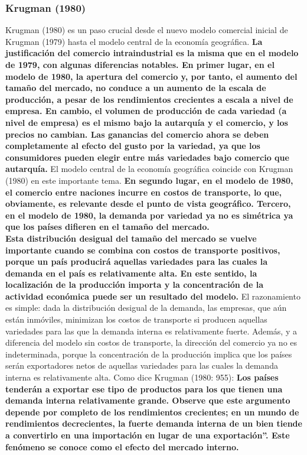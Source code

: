 \subsubsection{Krugman (1980)}
Krugman (1980) es un paso crucial desde el nuevo modelo comercial inicial de Krugman (1979) hasta el modelo central de la economía geográfica. \textbf{La justificación del comercio intraindustrial es la misma que en el modelo de 1979, con algunas diferencias notables. En primer lugar, en el modelo de 1980, la apertura del comercio y, por tanto, el aumento del tamaño del mercado, no conduce a un aumento de la escala de producción, a pesar de los rendimientos crecientes a escala a nivel de empresa. En cambio, el volumen de producción de cada variedad (a nivel de empresa) es el mismo bajo la autarquía y el comercio, y los precios no cambian. Las ganancias del comercio ahora se deben completamente al efecto del gusto por la variedad, ya que los consumidores pueden elegir entre más variedades bajo comercio que autarquía.} El modelo central de la economía geográfica coincide con Krugman (1980) en este importante tema. \textbf{En segundo lugar, en el modelo de 1980, el comercio entre naciones incurre en costos de transporte, lo que, obviamente, es relevante desde el punto de vista geográfico. Tercero, en el modelo de 1980, la demanda por variedad ya no es simétrica ya que los países difieren en el tamaño del mercado.}\\
\textbf{Esta distribución desigual del tamaño del mercado se vuelve importante cuando se combina con costos de transporte positivos, porque un país producirá aquellas variedades para las cuales la demanda en el país es relativamente alta. En este sentido, la localización de la producción importa y la concentración de la actividad económica puede ser un resultado del modelo.} El razonamiento es simple: dada la distribución desigual de la demanda, las empresas, que aún están inmóviles, minimizan los costos de transporte si producen aquellas variedades para las que la demanda interna es relativamente fuerte. Además, y a diferencia del modelo sin costos de transporte, la dirección del comercio ya no es indeterminada, porque la concentración de la producción implica que los países serán exportadores netos de aquellas variedades para las cuales la demanda interna es relativamente alta. Como dice Krugman (1980: 955): \textbf{Los países tenderán a exportar ese tipo de productos para los que tienen una demanda interna relativamente grande. Observe que este argumento depende por completo de los rendimientos crecientes; en un mundo de rendimientos decrecientes, la fuerte demanda interna de un bien tiende a convertirlo en una importación en lugar de una exportación”. Este fenómeno se conoce como el efecto del mercado interno.}\\
